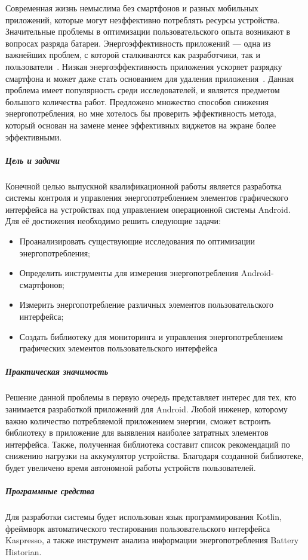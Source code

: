 

Современная жизнь немыслима без смартфонов и разных мобильных приложений, которые могут неэффективно потреблять ресурсы устройства. Значительные проблемы в оптимизации пользовательского опыта возникают в вопросах разряда батареи. Энергоэффективность приложений --- одна из важнейших проблем, с которой сталкиваются как разработчики, так и пользователи~\parencite{man2016experience, wasserman2010software}. Низкая энергоэффективность приложения ускоряет разрядку смартфона и может даже стать основанием для удаления приложения~\parencite{ickin2017users}. Данная проблема имеет популярность среди исследователей, и является предметом большого количества работ. Предложено множество способов снижения энергопотребления, но мне хотелось бы проверить эффективность метода, который основан на замене менее эффективных виджетов на экране более эффективными.

\subparagraph{Цель и задачи}
Конечной целью выпускной квалификационной работы является разработка системы контроля и управления энергопотреблением элементов графического интерфейса на устройствах под управлением операционной системы Android. Для её достижения необходимо решить следующие задачи:
\begin{itemize}
	\item Проанализировать существующие исследования по оптимизации энергопотребления;
	\item Определить инструменты для измерения энергопотребления Android-смартфонов;
	\item Измерить энергопотребление различных элементов пользовательского интерфейса;
	\item Создать библиотеку для мониторинга и управления энергопотреблением графических элементов пользовательского интерфейса
\end{itemize}

\subparagraph{Практическая значимость}
Решение данной проблемы в первую очередь представляет интерес для тех, кто занимается разработкой приложений для Android. Любой инженер, которому важно количество потребляемой приложением энергии, сможет встроить библиотеку в приложение для выявления наиболее затратных элементов интерфейса. Также, полученная библиотека составит список рекомендаций по снижению нагрузки на аккумулятор устройства. Благодаря созданной библиотеке, будет увеличено время автономной работы устройств пользователей.

\subparagraph{Программные средства}
Для разработки системы будет использован язык программирования Kotlin, фреймворк автоматического тестирования пользовательского интерфейса Kaspresso, а также инструмент анализа информации энергопотребления Battery Historian.